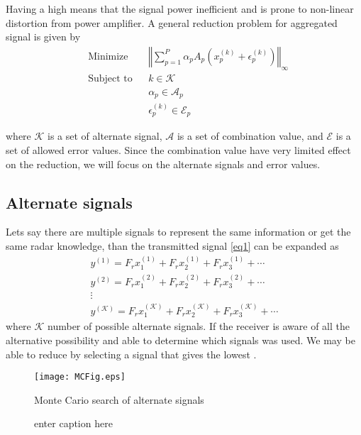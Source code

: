 \documentclass[conference]{IEEEtran}
\begin{document}
Having a high \PAR means that the signal power inefficient and is prone to non-linear distortion from power amplifier.  A general \PAR reduction problem for aggregated signal is given by 
\begin{equation}
     \begin{aligned}
      &\text{Minimize } & &\left\Vert\sum_{p=1}^P\alpha_pA_p\left(x_p^{(k)}+\epsilon_p^{(k)}\right)\right\Vert_\infty  \\
      &\text{Subject to} &  &k\in \mathcal{K} \\
      & & &\alpha_p\in\mathcal{A}_p\\
      & & &\epsilon_p^{(k)}\in\mathcal{E}_p 
     \end{aligned}
\end{equation}

where $\mathcal{K}$ is a set of alternate signal, $\mathcal{A}$ is a set of combination value, and $\mathcal{E}$ is a set of allowed error values.  Since the combination value have very limited effect on the \PAR reduction, we will focus on the alternate signals and error values.
\subsection{Alternate signals}
Lets say there are multiple signals to represent the same information or get the same radar knowledge, than the transmitted signal \eqref{eq1} can be expanded as
\begin{gather*}
y^{(1)}=F_rx_1^{(1)}+F_rx_2^{(1)}+F_rx_3^{(1)}+\cdots \\
y^{(2)}=F_rx_1^{(2)}+F_rx_2^{(2)}+F_rx_3^{(2)}+\cdots \\
\vdots \\
y^{(\mathcal{K})}=F_rx_1^{(\mathcal{K})}+F_rx_2^{(\mathcal{K})}+F_rx_3^{(\mathcal{K})}+\cdots
\end{gather*}
where $\mathcal{K}$ number of possible alternate signals. If the receiver is aware of all the alternative possibility and able to determine which signals was used.  We may be able to reduce \PAR by selecting a signal that gives the lowest \PAR.  
\begin{figure}
  \texttt{[image: MCFig.eps]}
  \caption{Monte Cario search of alternate signals}
\end{figure}

\begin{figure} %
  \centering
  \caption{enter caption here}%
  \label{fig:compsim2}
\end{figure}





\end{document}
